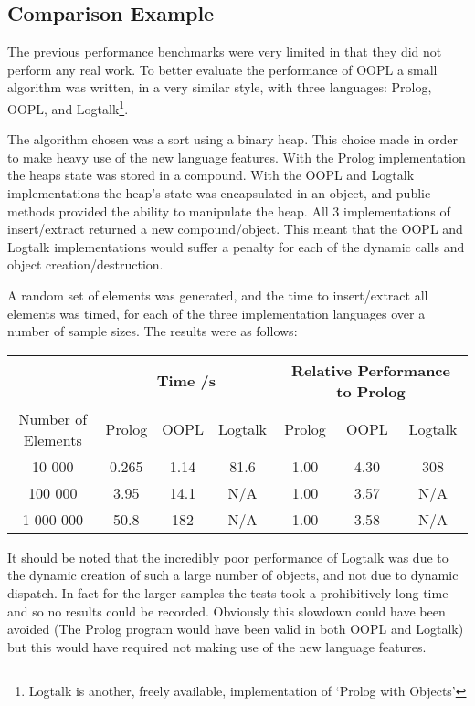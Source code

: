 \documentclass[12pt,a4paper,twoside,openright]{report}
\begin{document}
\subsection{Comparison Example}

The previous performance benchmarks were very limited in that they did not perform any real work. To better evaluate the performance of OOPL a small algorithm was written, in a very similar style, with three languages: Prolog, OOPL, and Logtalk\footnote{Logtalk is another, freely available, implementation of `Prolog with Objects'}.

\bigskip

The algorithm chosen was a sort using a binary heap. This choice made in order to make heavy use of the new language features. With the Prolog implementation the heaps state was stored in a compound. With the OOPL and Logtalk implementations the heap's state was encapsulated in an object, and public methods provided the ability to manipulate the heap. All 3 implementations of insert/extract returned a new compound/object. This meant that the OOPL and Logtalk implementations would suffer a penalty for each of the dynamic calls and object creation/destruction.

\bigskip

A random set of elements was generated, and the time to insert/extract all elements was timed, for each of the three implementation languages over a number of sample sizes. The results were as follows:

\begin{center}
\begin{tabular}{c|c|c|c|c|c|c}
 & \multicolumn{3}{c}{Time /s} &  \multicolumn{3}{c}{Relative Performance to Prolog}\\
 \hline
Number of Elements 	& Prolog & OOPL & Logtalk & Prolog & OOPL & Logtalk \\
\hline
 10 000				& 0.265	& 1.14	& 81.6 & 1.00	& 4.30	& 308		\\
 100 000			& 3.95	& 14.1	& N/A  & 1.00	& 3.57	& N/A		\\
 1 000 000			& 50.8	&182 	& N/A  & 1.00	& 3.58	& N/A		\\
\end{tabular}
\end{center}

It should be noted that the incredibly poor performance of Logtalk was due to the dynamic creation of such a large number of objects, and not due to dynamic dispatch. In fact for the larger samples the tests took a prohibitively long time and so no results could be recorded. Obviously this slowdown could have been avoided (The Prolog program would have been valid in both OOPL and Logtalk) but this would have required not making use of the new language features.
\end{document}
